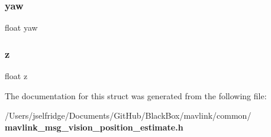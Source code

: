 \subsubsection{yaw}
{\footnotesize\ttfamily float yaw}

\mbox{\label{struct____mavlink__vision__position__estimate__t_af73583b1e980b0aa03f9884812e9fd4d}} 
\subsubsection{z}
{\footnotesize\ttfamily float z}



The documentation for this struct was generated from the following file\+:\begin{DoxyCompactItemize}
\item 
/\+Users/jselfridge/\+Documents/\+Git\+Hub/\+Black\+Box/mavlink/common/\textbf{ mavlink\+\_\+msg\+\_\+vision\+\_\+position\+\_\+estimate.\+h}\end{DoxyCompactItemize}
